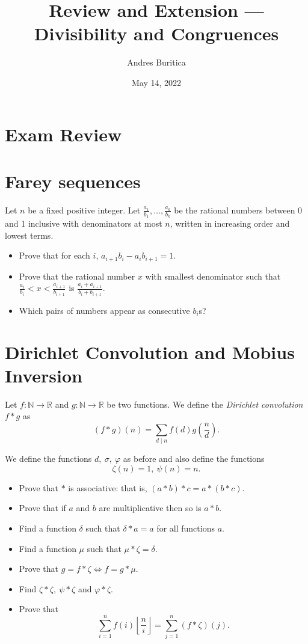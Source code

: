 \documentclass{article}
\title{Review and Extension --- Divisibility and Congruences}
\author{Andres Buritica}
\date{May 14, 2022}
\begin{document}
\maketitle
\section{Exam Review}
\newpage
\section{Farey sequences}
  Let $n$ be a fixed positive integer. Let
  $\frac{a_1}{b_1},\ldots,\frac{a_k}{b_k}$ be the rational numbers between 0
  and 1 inclusive with denominators at most $n$, written in increasing order
  and lowest terms.
  \begin{itemize}
    \item Prove that for each $i$, $a_{i+1}b_i-a_i b_{i+1}=1$.
    \item Prove that the rational number $x$ with smallest denominator such
      that $\frac{a_i}{b_i}<x<\frac{a_{i+1}}{b_{i+1}}$ is
      $\frac{a_i+a_{i+1}}{b_i+b_{i+1}}$. 
    \item Which pairs of numbers appear as consecutive $b_i$s?
  \end{itemize}
\section{Dirichlet Convolution and Mobius Inversion}
  Let $f:\mathbb N\to\mathbb R$ and $g:\mathbb N\to\mathbb R$ be two functions.
  We define the \emph{Dirichlet convolution} $f*g$ as
  \[(f*g)(n)=\sum_{d\mid n}f(d)g\left(\frac nd\right).\]

  We define the functions $d,\ \sigma,\ \varphi$ as before and also define the
  functions \[\zeta(n)=1,\ \psi(n)=n.\]
  \begin{itemize}
    \item Prove that $*$ is associative: that is,
      $(a*b)*c=a*(b*c)$.
    \item Prove that if $a$ and $b$ are multiplicative then so is $a*b$.
    \item Find a function $\delta$ such that $\delta*a=a$ for all functions $a$.
    \item Find a function $\mu$ such that $\mu*\zeta=\delta$.
    \item Prove that $g=f*\zeta\iff f=g*\mu$.
    \item Find $\zeta*\zeta,\ \psi*\zeta$ and $\varphi*\zeta$.
    \item Prove that
      \[\sum_{i=1}^n f(i)\left\lfloor\frac
          ni\right\rfloor=\sum_{j=1}^n(f*\zeta)(j).\]
  \end{itemize}
\newpage
\end{document}
